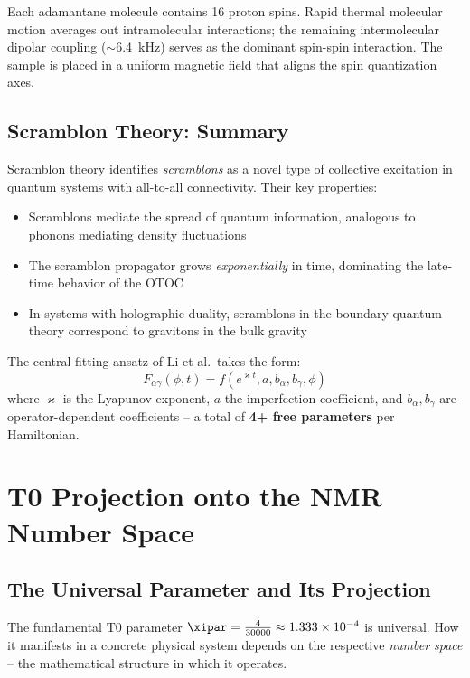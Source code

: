 Each adamantane molecule contains 16 proton spins. Rapid thermal molecular motion averages out intramolecular interactions; the remaining intermolecular dipolar coupling ($\sim$6.4~kHz) serves as the dominant spin-spin interaction. The sample is placed in a uniform magnetic field that aligns the spin quantization axes.

\subsection{Scramblon Theory: Summary}

Scramblon theory \cite{kitaev_soft_mode_2018, gu_kitaev_2019, stanford_subleading_2022} identifies \emph{scramblons} as a novel type of collective excitation in quantum systems with all-to-all connectivity. Their key properties:

\begin{itemize}
	\item Scramblons mediate the spread of quantum information, analogous to phonons mediating density fluctuations
	\item The scramblon propagator grows \emph{exponentially} in time, dominating the late-time behavior of the OTOC
	\item In systems with holographic duality, scramblons in the boundary quantum theory correspond to gravitons in the bulk gravity
\end{itemize}

The central fitting ansatz of Li et al.\ takes the form:
\begin{equation}
	F_{\alpha\gamma}(\phi, t) = f\left(e^{\varkappa t}, a, b_\alpha, b_\gamma, \phi\right)
	\label{eq:scramblon_ansatz}
\end{equation}
where $\varkappa$ is the Lyapunov exponent, $a$ the imperfection coefficient, and $b_\alpha, b_\gamma$ are operator-dependent coefficients -- a total of \textbf{4+ free parameters} per Hamiltonian.


\section{T0 Projection onto the NMR Number Space}
\label{sec:t0projection}

\subsection{The Universal Parameter and Its Projection}

The fundamental T0 parameter $\xipar = \frac{4}{30000} \approx 1.333 \times 10^{-4}$ is universal. How it manifests in a concrete physical system depends on the respective \emph{number space} -- the mathematical structure in which it operates.

